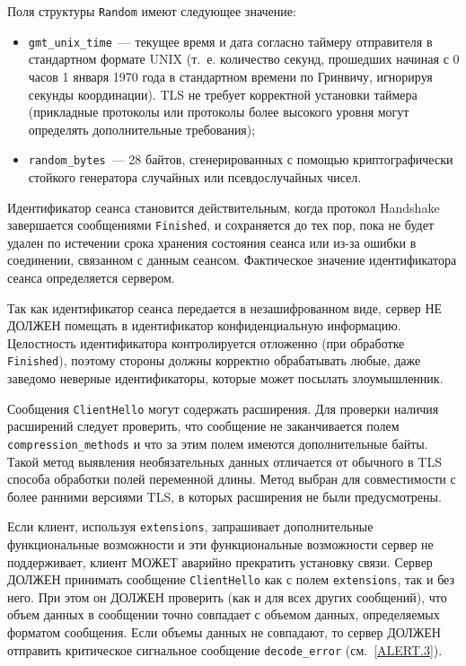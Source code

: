 Поля структуры \lstinline{Random} имеют следующее значение:
\begin{itemize}
\item[--]
\lstinline{gmt_unix_time}~--- текущее время и дата согласно таймеру 
отправителя в стандартном формате UNIX (т.~е. количество секунд, прошедших 
начиная с 0 часов 1 января 1970 года в стандартном времени по Гринвичу, 
игнорируя секунды координации). TLS не требует корректной установки 
таймера (прикладные протоколы или протоколы более высокого уровня могут 
определять дополнительные требования); 

\item[--]
\lstinline{random_bytes}~--- 28 байтов, сгенерированных с помощью 
криптографически стойкого генератора случайных или псевдослучайных чисел. 
\end{itemize}

Идентификатор сеанса становится действительным, когда протокол
Handshake завершается сообщениями \lstinline{Finished}, и
сохраняется до тех пор, пока не будет удален по истечении срока хранения
состояния сеанса или из-за ошибки в соединении, связанном с данным сеансом.
Фактическое значение идентификатора сеанса определяется сервером.

Так как идентификатор сеанса передается в незашифрованном виде, сервер НЕ
ДОЛЖЕН помещать в идентификатор конфиденциальную информацию. Целостность
идентификатора контролируется отложенно (при обработке
\lstinline{Finished}), поэтому стороны должны корректно обрабатывать любые,
даже заведомо неверные идентификаторы, которые может посылать
злоумышленник.

Сообщения \lstinline{ClientHello} могут содержать расширения. Для проверки наличия 
расширений следует проверить, что сообщение не заканчивается полем 
\lstinline{compression_methods} и что за этим полем имеются дополнительные байты. 
Такой метод выявления необязательных данных отличается от обычного в TLS 
способа обработки полей переменной длины. Метод выбран для совместимости с 
более ранними версиями TLS, в которых расширения не были предусмотрены. 
 
Если клиент, используя \lstinline{extensions}, запрашивает дополнительные
функциональные возможности и эти функциональные возможности сервер не
поддерживает, клиент МОЖЕТ аварийно прекратить установку связи. Сервер
ДОЛЖЕН принимать сообщение \lstinline{ClientHello} как с полем
\lstinline{extensions}, так и без него. При этом он ДОЛЖЕН проверить (как и
для всех других сообщений), что объем данных в сообщении точно совпадает с
объемом данных, определяемых форматом сообщения. Если объемы данных не
совпадают, то сервер ДОЛЖЕН отправить критическое сигнальное сообщение
\lstinline{decode_error} (см.~\ref{ALERT.3}).

